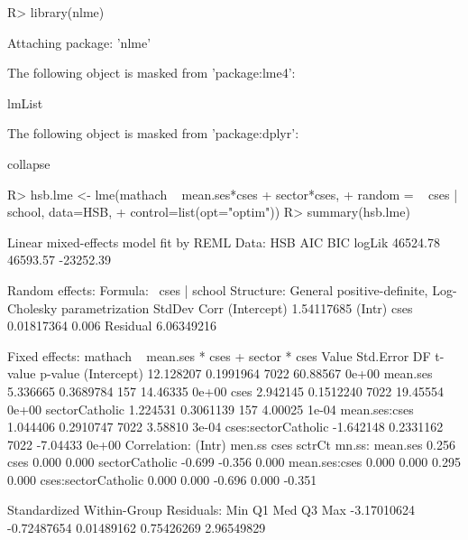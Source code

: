 \documentclass[
]{jss}
\begin{document}
\begin{CodeChunk}
\begin{CodeInput}
R> library(nlme)
\end{CodeInput}
\begin{CodeOutput}

Attaching package: 'nlme'
\end{CodeOutput}
\begin{CodeOutput}
The following object is masked from 'package:lme4':

    lmList
\end{CodeOutput}
\begin{CodeOutput}
The following object is masked from 'package:dplyr':

    collapse
\end{CodeOutput}
\begin{CodeInput}
R> hsb.lme <- lme(mathach ~ mean.ses*cses + sector*cses,
+                  random = ~ cses | school, data=HSB,
+                control=list(opt="optim"))
R> summary(hsb.lme)
\end{CodeInput}
\begin{CodeOutput}
Linear mixed-effects model fit by REML
  Data: HSB 
       AIC      BIC    logLik
  46524.78 46593.57 -23252.39

Random effects:
 Formula: ~cses | school
 Structure: General positive-definite, Log-Cholesky parametrization
            StdDev     Corr  
(Intercept) 1.54117685 (Intr)
cses        0.01817364 0.006 
Residual    6.06349216       

Fixed effects:  mathach ~ mean.ses * cses + sector * cses 
                        Value Std.Error   DF  t-value p-value
(Intercept)         12.128207 0.1991964 7022 60.88567   0e+00
mean.ses             5.336665 0.3689784  157 14.46335   0e+00
cses                 2.942145 0.1512240 7022 19.45554   0e+00
sectorCatholic       1.224531 0.3061139  157  4.00025   1e-04
mean.ses:cses        1.044406 0.2910747 7022  3.58810   3e-04
cses:sectorCatholic -1.642148 0.2331162 7022 -7.04433   0e+00
 Correlation: 
                    (Intr) men.ss cses   sctrCt mn.ss:
mean.ses             0.256                            
cses                 0.000  0.000                     
sectorCatholic      -0.699 -0.356  0.000              
mean.ses:cses        0.000  0.000  0.295  0.000       
cses:sectorCatholic  0.000  0.000 -0.696  0.000 -0.351

Standardized Within-Group Residuals:
        Min          Q1         Med          Q3         Max 
-3.17010624 -0.72487654  0.01489162  0.75426269  2.96549829 


\end{CodeOutput}
\end{CodeChunk}
\end{document}
